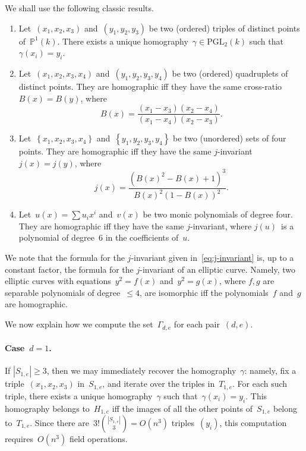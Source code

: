 \documentclass{lms}%
\def\acco#1{\left\{#1\right\}}
\def\abs#1{\left|#1\right|}
\def\card#1{\abs{#1}}
\begin{document}
We shall use the following classic results.
\begin{prop}\label{prop:homography}
\begin{enumerate}
\item Let~$(x_1, x_2, x_3)$ and~$(y_1, y_2, y_3)$ be two (ordered)
triples of distinct points of~$ℙ^1(k)$. There exists a unique
homography~$γ ∈ \mathrm{PGL}_2(k)$ such that~$γ(x_i) = y_i$.
\item Let~$(x_1, x_2, x_3, x_4)$ and~$(y_1, y_2, y_3, y_4)$ be two
(ordered) quadruplets of distinct points. They are homographic iff they
have the same cross-ratio~$B(x) = B(y)$, where
\begin{equation}
B(x) = \frac{(x_1-x_3)(x_2-x_4)}{(x_1-x_4)(x_2-x_3)}.
\end{equation}
\item Let~$\acco{x_1, x_2, x_3, x_4}$ and~$\acco{y_1, y_2, y_3, y_4}$ be
two (unordered) sets of four points. They are homographic iff they have
the same $j$-invariant~$j(x) = j(y)$, where
\begin{equation}\label{eq:j-invariant}
j(x) = \frac{(B(x)^2-B(x)+1)^3}{B(x)^2(1-B(x))^2}.
\end{equation}
\item Let~$u(x) = ∑ u_i x^i$ and~$v(x)$ be two monic polynomials
of degree four. They are homographic iff they have the same $j$-invariant,
where $j(u)$~is a polynomial of degree~$6$ in the coefficients of~$u$.
\end{enumerate}
\end{prop}

We note that the formula for the $j$-invariant given
in~\eqref{eq:j-invariant} is, up to a constant factor, the formula for
the $j$-invariant of an elliptic curve. Namely, two elliptic curves with
equations~$y^2 = f(x)$ and~$y^2 = g(x)$, where $f, g$ are separable
polynomials of degree~$≤ 4$, are isomorphic iff the polynomials~$f$
and~$g$ are homographic.

\bigbreak
We now explain how we compute the set~$Γ_{d,e}$ for each pair~$(d,e)$.

\paragraph{Case~$d = 1$.}
If $\card{S_{1,e}} ≥ 3$, then we may immediately recover the
homography~$γ$: namely, fix a triple~$(x_1,x_2,x_3)$ in~$S_{1,e}$, and
iterate over the triples in~$T_{1,e}$. For each such triple, there exists
a unique homography~$γ$ such that~$γ(x_i) = y_i$. This homography belongs
to~$H_{1,e}$ iff the images of all the other points of~$S_{1,e}$ belong
to~$T_{1,e}$. Since there are~$3!\binom{\card{S_{1,e}}}{3} = O(n^3)$
triples~$(y_i)$, this computation requires~$O(n^3)$ field operations.
\end{document}
